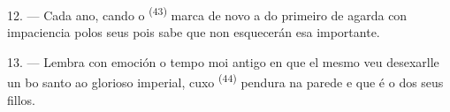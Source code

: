 12. --- Cada ano, cando o  \textsuperscript{(43)} marca de novo a
 do primeiro de  agarda con impaciencia polos seus
 pois sabe que non esquecerán esa  importante.

13. --- Lembra con emoción o tempo moi antigo en que el mesmo veu desexarlle un bo santo ao
glorioso  imperial, cuxo  \textsuperscript{(44)} pendura na
parede e que é o  dos seus fillos.
